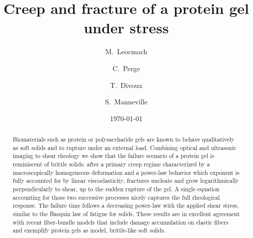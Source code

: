 \documentclass[twocolumn,superscriptaddress,showpacs,preprintnumbers,amsmath,amssymb,prl]{revtex4}
\begin{document}

 \title{Creep and fracture of a protein gel under stress}

\author{M.~Leocmach}
\author{C.~Perge}
\author{T.~Divoux}
\author{S.~Manneville}

\date{\today}

\begin{abstract}
Biomaterials such as protein or polysaccharide gels are known to behave qualitatively as soft solids and to rupture under an external load. Combining optical and ultrasonic imaging to shear rheology we show that the failure scenario of a protein gel is reminiscent of brittle solids: after a primary creep regime characterized by a macroscopically homogeneous deformation and a power-law behavior which exponent is fully accounted for by linear viscoelasticity, fractures nucleate and grow logarithmically perpendicularly to shear, up to the sudden rupture of the gel. A single equation accounting for those two successive processes nicely captures the full rheological response. The failure time follows a decreasing power-law with the applied shear stress, similar to the Basquin law of fatigue for solids. These results are in excellent agreement with recent fiber-bundle models that include damage accumulation on elastic fibers and exemplify protein gels as model, brittle-like soft solids.
\end{abstract}

\pacs{}
\maketitle
\end{document}

